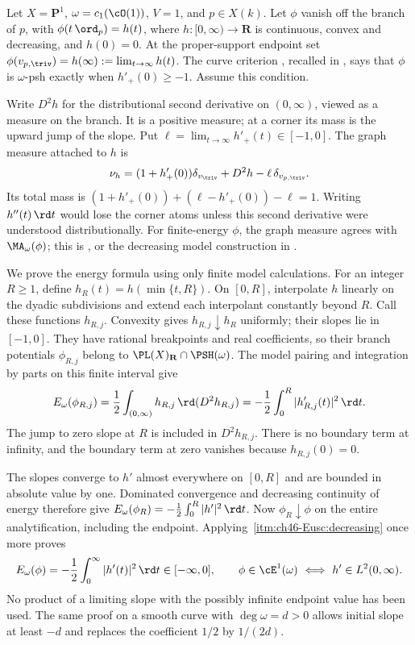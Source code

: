 \begin{example}
\label{ex:ch46-e1-curve}
Let $X=\mathbf P^1$, $\omega=c_1(\cO(1))$, $V=1$, and $p\in X(k)$.
Let $\phi$ vanish off the branch of $p$, with
$\phi(t\,\ord_p)=h(t)$, where $h:[0,\infty)\to\mathbf R$ is continuous,
convex and decreasing, and $h(0)=0$.
At the proper-support endpoint set
$\phi(v_{p,\triv})=h(\infty):=\lim_{t\to\infty}h(t)$.
The curve criterion \cite[Example~4.13]{BJ22}, recalled in
, says that $\phi$ is $\omega$-psh exactly when
$h'_+(0)\geq-1$.  Assume this condition.

Write $D^2h$ for the distributional second derivative on $(0,\infty)$,
viewed as a measure on the branch.  It is a positive measure; at a
corner its mass is the upward jump of the slope.  Put
$\ell=\lim_{t\to\infty}h'_+(t)\in[-1,0]$.
The graph measure attached to $h$ is
\[
 \nu_h=(1+h'_+(0))\delta_{v_{\triv}}
          +D^2h-\ell\,\delta_{v_{p,\triv}}.
\]
Its total mass is
$(1+h'_+(0))+(\ell-h'_+(0))-\ell=1$.
Writing $h''(t)\,\rd t$ would lose the corner atoms unless this
second derivative were understood distributionally.
For finite-energy $\phi$, the graph measure agrees with
$\MA_\omega(\phi)$; this is \cite[Example~7.20]{BJ22}, or the
decreasing model construction in .

We prove the energy formula using only finite model calculations.
For an integer $R\geq1$, define $h_R(t)=h(\min\{t,R\})$.
On $[0,R]$, interpolate $h$ linearly on the dyadic subdivisions and
extend each interpolant constantly beyond $R$.  Call these functions
$h_{R,j}$.  Convexity gives
$h_{R,j}\downarrow h_R$ uniformly; their slopes lie in $[-1,0]$.
They have rational breakpoints and real coefficients, so their branch
potentials $\phi_{R,j}$ belong to
$\PL(X)_{\mathbf R}\cap\PSH(\omega)$.
The model pairing and integration by parts on this finite interval give
\[
 E_\omega(\phi_{R,j})
    =\frac12\int_{(0,\infty)}h_{R,j}\,\rd(D^2h_{R,j})
    =-\frac12\int_0^R|h'_{R,j}(t)|^2\,\rd t.
\]
The jump to zero slope at $R$ is included in $D^2h_{R,j}$.
There is no boundary term at infinity, and the boundary term at zero
vanishes because $h_{R,j}(0)=0$.

The slopes converge to $h'$ almost everywhere on $[0,R]$ and are
bounded in absolute value by one.  Dominated convergence and decreasing
continuity of energy therefore give
$E_\omega(\phi_R)=-\tfrac12\int_0^R|h'|^2\,\rd t$.
Now $\phi_R\downarrow\phi$ on the entire analytification, including the
endpoint.  Applying
\,\cref{itm:ch46-Eusc:decreasing} once more
proves
\[
 E_\omega(\phi)=-\frac12\int_0^\infty|h'(t)|^2\,\rd t
       \in[-\infty,0],
 \qquad
 \phi\in\cE^1(\omega)\ \Longleftrightarrow\ h'\in L^2(0,\infty).
\]
No product of a limiting slope with the possibly infinite endpoint
value has been used.  The same proof on a smooth curve with
$\deg\omega=d>0$ allows initial slope at least $-d$ and replaces
the coefficient $1/2$ by $1/(2d)$.


\end{example}
